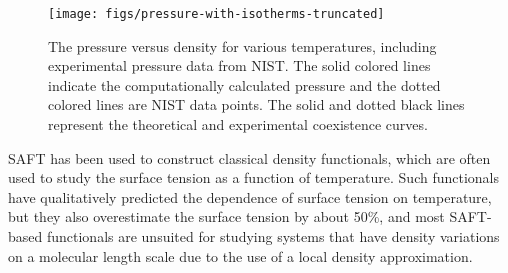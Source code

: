 \documentclass[twocolumn,amsmath,amssymb,prl]{revtex4-1}
\begin{document}
\begin{figure}
\begin{center}
\texttt{[image: figs/pressure-with-isotherms-truncated]}
\end{center}
\caption{The pressure versus density for various temperatures, including
experimental pressure data from NIST\cite{nistwater}. The solid colored lines
indicate the computationally calculated pressure and the dotted
colored lines are NIST data points. The solid and dotted black lines
represent the theoretical and experimental coexistence curves.}
\label{fig:pressure-with-isotherms}
\end{figure}

SAFT has been used to construct classical density functionals,
which are often used to study the surface tension as a function of
temperature\cite{clark2006developing, gloor2004accurate, kahl2008modified,
  gloor2007prediction, blas2001examination, kiselev2006new,
  gloor2002saft,fu2005vapor-liquid-dft, gross2009density,
  yang1994density, Jaqaman2004}.  Such
functionals have qualitatively predicted the dependence of surface
tension on temperature, but they also overestimate
the surface tension by about 50\%, and most SAFT-based functionals are
unsuited for studying systems that have density variations on a
molecular length scale due to the use of a local density
approximation\cite{gloor2002saft,clark2006developing, gloor2007prediction,
gloor2004accurate, kahl2008modified,
blas2001examination, kiselev2006new}.

\end{document}
